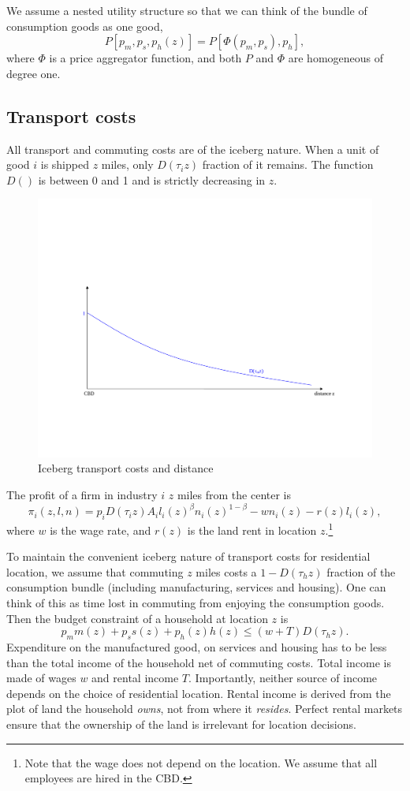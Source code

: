 \documentclass[12pt]{article}
\begin{document}
We assume a nested utility structure so that we can think of the bundle of consumption goods as one good,
    \[
P[p_m,p_s,p_h(z)] = P[\Phi(p_m,p_s),p_h],
    \]
where $\Phi$ is a price aggregator function, and both $P$ and $\Phi$ are homogeneous of degree one.

\subsection{Transport costs}
All transport and commuting costs are of the iceberg nature. When a unit of good $i$ is shipped $z$ miles, only $D(\tau_i z)$ fraction of it remains. The function $D()$ is between 0 and 1 and is strictly decreasing in $z$.

\begin{figure}[h!]
\centering
  \includegraphics[width=0.7\linewidth]{figures/Dz}
  \vspace*{-1em}
  \caption{Iceberg transport costs and distance}\label{fig:Dz}
\end{figure}

The profit of a firm in industry $i$ $z$ miles from the center is
\[
\pi_i(z,l,n) = p_iD(\tau_i z)A_il_i(z)^\beta n_i(z)^{1-\beta} - wn_i(z) - r(z)l_i(z),
\]
where $w$ is the wage rate, and $r(z)$ is the land rent in location $z$.\footnote{Note that the wage does not depend on the location. We assume that all employees are hired in the CBD.}

To maintain the convenient iceberg nature of transport costs for residential location, we assume that commuting $z$ miles costs a $1-D(\tau_h z)$ fraction of the consumption bundle (including manufacturing, services and housing). One can think of this as time lost in commuting from enjoying the consumption goods. Then the budget constraint of a household at location $z$ is
\[
p_m m(z) + p_s s(z) + p_h(z) h(z) \le (w+T)D(\tau_h z).
\]
Expenditure on the manufactured good, on services and housing has to be less than the total income of the household net of commuting costs. Total income is made of wages $w$ and rental income $T$. Importantly, neither source of income depends on the choice of residential location. Rental income is derived from the plot of land the household \emph{owns}, not from where it \emph{resides}. Perfect rental markets ensure that the ownership of the land is irrelevant for location decisions.
\end{document}
